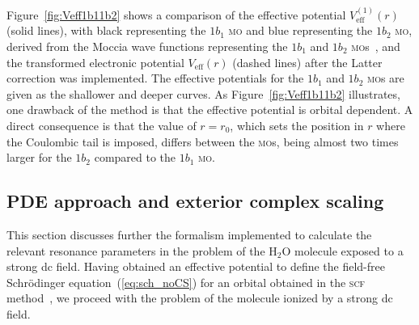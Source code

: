 Figure~\ref{fig:Veff1b11b2} shows a comparison of the effective
potential $V_{\mathrm{eff}}^{(1)}(r)$ (solid lines), with black
representing the $1b_{1}$ \textsc{mo} and blue representing the
$1b_{2}$ \textsc{mo}, derived from the Moccia wave functions
representing the $1b_{1}$ and $1b_{2}$
\textsc{mo}s~\cite{Moccia_1964}, and the transformed electronic
potential $V_{\mathrm{eff}}(r)$ (dashed lines) after the Latter
correction was implemented. The effective potentials for the $1b_{1}$
and $1b_{2}$ \textsc{mo}s are given as the shallower and deeper
curves. As Figure~\ref{fig:Veff1b11b2} illustrates, one drawback of
the method is that the effective potential is orbital dependent. A
direct consequence is that the value of $r=r_{0}$, which sets the
position in $r$ where the Coulombic tail is imposed, differs between
the \textsc{mo}s, being almost two times larger for the $1b_{2}$
compared to the $1b_{1}$ \textsc{mo}.


\subsection{PDE approach and exterior complex scaling}
\label{ch:ecs_1b11b2}

This section discusses further the formalism implemented to calculate
the relevant resonance parameters in the problem of the H$_{2}$O
molecule exposed to a strong dc field. Having obtained an effective
potential to define the field-free Schr\"{o}dinger
equation~(\ref{eq:sch_noCS}) for an orbital obtained in the
\textsc{scf} method~\cite{Moccia_1964}, we proceed with the problem of
the molecule ionized by a strong dc field.

